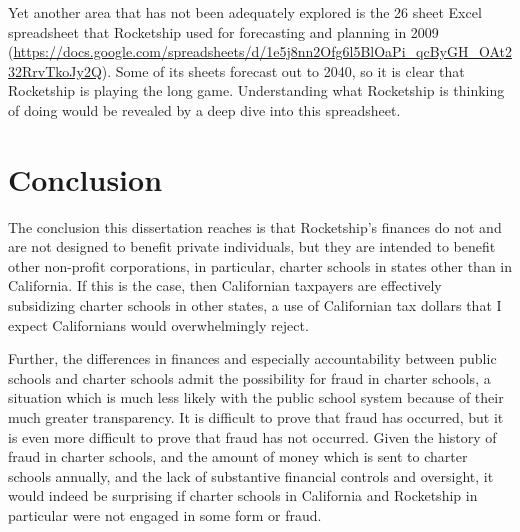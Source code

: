 Yet another area that has not been adequately explored is the 26 sheet Excel spreadsheet that Rocketship used for forecasting and planning in 2009 (\url{https://docs.google.com/spreadsheets/d/1e5j8nn2Ofg6l5BlOaPi_qcByGH_OAt232RrvTkoJy2Q}). Some of its sheets forecast out to 2040, so it is clear that Rocketship is playing the long game. Understanding what Rocketship is thinking of doing would be revealed by a deep dive into this spreadsheet.

\section{Conclusion}%
\label{sec:conclusion}\indent%

The conclusion this dissertation reaches is that Rocketship's finances do not and are not designed to benefit private individuals, but they are intended to benefit other non-profit corporations, in particular, charter schools in states other than in California. If this is the case, then Californian taxpayers are effectively subsidizing charter schools in other states, a use of Californian tax dollars that I expect Californians would overwhelmingly reject.

Further, the differences in finances and especially accountability between public schools and charter schools admit the possibility for fraud in charter schools, a situation which is much less likely with the public school system because of their much greater transparency. It is difficult to prove that fraud has occurred, but it is even more difficult to prove that fraud has not occurred. Given the history of fraud in charter schools, and the amount of money which is sent to charter schools annually, and the lack of substantive financial controls and oversight, it would indeed be surprising if charter schools in California and Rocketship in particular were not engaged in some form or fraud.

